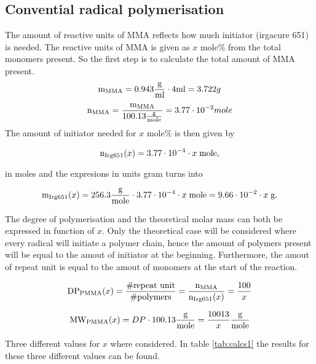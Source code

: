 \subsection{Convential radical polymerisation}

    The amount of reactive units of MMA reflects how much initiator (irgacure 651) is needed.
    The reactive units of MMA is given as $x$ mole\% from the total monomers present. So the first step
    is to calculate the total amount of MMA present.
    $$\mathtext[MMA]{m} = 0.943\density\cdot 4 \ml = 3.722 g$$
    $$\mathtext[MMA]{n} = \frac{\mathtext[MMA]{m}}{100.13\MW} = 3.77 \cdot 10^{-2} mole$$
    The amount of initiator needed for $x$ mole\% is then given by

    \begin{equation}
        \mathtext[Irg651]{n}(x) = 3.77\cdot10^{-4}\cdot x \;\mole,
        \label{eq:molepercent}
    \end{equation}

    in moles and the expresions in units gram turns into

    \begin{equation}
        \mathtext[Irg651]{m}(x) = 256.3\MW\cdot3.77\cdot10^{-4}\cdot x \;\mole = 9.66\cdot10^{-2}\cdot x \;\g.
        \label{eq:molepercent_grams}
    \end{equation}

    The degree of polymerisation and the theoretical molar mass can both be expressed in function of $x$. Only the theoretical
    case will be considered where every radical will initiate a polymer chain, hence the amount of polymers present will be equal 
    to the amout of initiator at the beginning. Furthermore, the amout of repeat unit is equal to the amout of monomers at the start
    of the reaction.

    \begin{equation}
        \mathtext[PMMA]{DP}(x) = \frac{\# \text{repeat unit}}{\# \text{polymers}} = \frac{\mathtext[MMA]{n}}{\mathtext[Irg651]{n}(x)} = \frac{100}{x} \\
        \label{eq:DPx}
    \end{equation}

    \begin{equation}
        \mathtext[PMMA]{MW}(x) = DP\cdot 100.13\MW = \frac{10013}{x} \MW
        \label{eq:MWx}
    \end{equation}

    Three different values for $x$ where considered. In table \ref{tab:calcs1} the results for these three 
    different values can be found.


